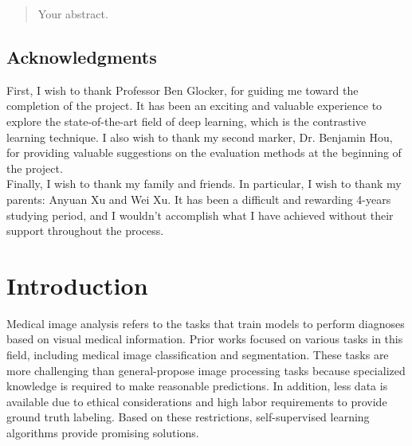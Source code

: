 \documentclass[12pt,twoside]{report}
\begin{document}



\clearpage{\pagestyle{empty}\cleardoublepage}
\setcounter{page}{1}
\pagestyle{fancy}

\begin{abstract}
Your abstract.
\end{abstract}

\section*{Acknowledgments}
First, I wish to thank Professor Ben Glocker, for guiding me toward the completion of the project. It has been an exciting and valuable experience to explore the state-of-the-art field of deep learning, which is the contrastive learning technique. I also wish to thank my second marker, Dr. Benjamin Hou, for providing valuable suggestions on the evaluation methods at the beginning of the project. \\

Finally, I wish to thank my family and friends. In particular, I wish to thank my parents: Anyuan Xu and Wei Xu. It has been a difficult and rewarding 4-years studying period, and I wouldn't accomplish what I have achieved without their support throughout the process. 




\tableofcontents 


\setcounter{page}{1}
\fancyhead[LE,RO]{\slshape \rightmark}
\fancyhead[LO,RE]{\slshape \leftmark}

\chapter{Introduction}

Medical image analysis refers to the tasks that train models to perform diagnoses based on visual medical information. Prior works focused on various tasks in this field, including medical image classification and segmentation. These tasks are more challenging than general-propose image processing tasks because specialized knowledge is required to make reasonable predictions. In addition, less data is available due to ethical considerations and high labor requirements to provide ground truth labeling. Based on these restrictions, self-supervised learning algorithms provide promising solutions. \\
\end{document}
